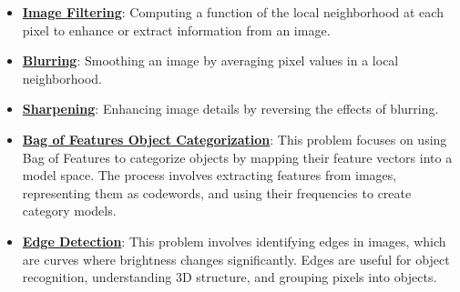 \documentclass{article}%
\begin{document}
\begin{itemize}[leftmargin=*]
\item \href{https://purdue.brightspace.com/d2l/common/assets/pdfjs-d2l-dist/1.0.14-legacy/web/viewer.html?file=%2Fcontent%2Fenforced%2F1095467-wl.202510.CS.24300.001%2F07L2-Vision.pdf%3Fou%3D1095467&lang=en-us&container=d2l-fileviewer-rendered-pdf&fullscreen=d2l-fileviewer-rendered-pdf-dialog&height=667#page=49}{\textbf{Image Filtering}}: Computing a function of the local neighborhood at each pixel to enhance or extract information from an image.%
\item \href{https://purdue.brightspace.com/d2l/common/assets/pdfjs-d2l-dist/1.0.14-legacy/web/viewer.html?file=%2Fcontent%2Fenforced%2F1095467-wl.202510.CS.24300.001%2F07L2-Vision.pdf%3Fou%3D1095467&lang=en-us&container=d2l-fileviewer-rendered-pdf&fullscreen=d2l-fileviewer-rendered-pdf-dialog&height=667#page=50}{\textbf{Blurring}}: Smoothing an image by averaging pixel values in a local neighborhood.%
\item \href{https://purdue.brightspace.com/d2l/common/assets/pdfjs-d2l-dist/1.0.14-legacy/web/viewer.html?file=%2Fcontent%2Fenforced%2F1095467-wl.202510.CS.24300.001%2F07L2-Vision.pdf%3Fou%3D1095467&lang=en-us&container=d2l-fileviewer-rendered-pdf&fullscreen=d2l-fileviewer-rendered-pdf-dialog&height=667#page=52}{\textbf{Sharpening}}: Enhancing image details by reversing the effects of blurring.%
\item \href{https://purdue.brightspace.com/d2l/common/assets/pdfjs-d2l-dist/1.0.14-legacy/web/viewer.html?file=%2Fcontent%2Fenforced%2F1095467-wl.202510.CS.24300.001%2F08L2-Feature Extraction.pdf%3Fou%3D1095467&lang=en-us&container=d2l-fileviewer-rendered-pdf&fullscreen=d2l-fileviewer-rendered-pdf-dialog&height=667#page=3}{\textbf{Bag of Features Object Categorization}}: This problem focuses on using Bag of Features to categorize objects by mapping their feature vectors into a model space. The process involves extracting features from images, representing them as codewords, and using their frequencies to create category models.%
\item \href{https://purdue.brightspace.com/d2l/common/assets/pdfjs-d2l-dist/1.0.14-legacy/web/viewer.html?file=%2Fcontent%2Fenforced%2F1095467-wl.202510.CS.24300.001%2F08L2-Feature Extraction.pdf%3Fou%3D1095467&lang=en-us&container=d2l-fileviewer-rendered-pdf&fullscreen=d2l-fileviewer-rendered-pdf-dialog&height=667#page=4}{\textbf{Edge Detection}}: This problem involves identifying edges in images, which are curves where brightness changes significantly. Edges are useful for object recognition, understanding 3D structure, and grouping pixels into objects.%

\end{itemize}
\end{document}
